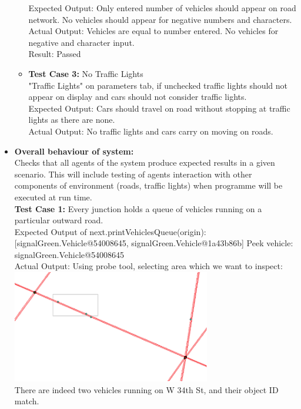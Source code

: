 \documentclass[11pt, oneside]{article}   	%
\begin{document}
\begin{itemize}
\begin{itemize}
Expected Output: Only entered number of vehicles should appear on road network. No vehicles should appear for negative numbers and characters. \hfill \\
Actual Output:  Vehicles are equal to number entered. No vehicles for negative and character input.\hfil \\

Result: Passed
\item \textbf{Test Case 3:} No Traffic Lights\hfill \\
"Traffic Lights" on parameters tab, if unchecked traffic lights should not appear on display and cars should not consider traffic lights.\hfill \\
Expected Output: Cars should travel on road without stopping at traffic lights as there are none.\hfill \\
Actual Output: No traffic lights and cars carry on moving on roads.
\end{itemize}
\item \textbf{Overall behaviour of system: }\hfill \\
Checks that all agents of the system produce expected results in a given scenario. This will include testing of agents interaction with other components of environment (roads, traffic lights) when programme will be executed at run time.\hfill \\
\textbf{Test Case 1:} Every junction holds a queue of vehicles running on a particular outward road.\hfill \\
Expected Output of next.printVehiclesQueue(origin):[signalGreen.Vehicle@54008645, signalGreen.Vehicle@1a43b86b] Peek vehicle: signalGreen.Vehicle@54008645\hfill \\
Actual Output: Using probe tool, selecting area which we want to inspect:\hfill \\
\includegraphics{RoadNetwork}\hfill \\
There are indeed two vehicles running on W 34th St, and their object ID match.

\end{itemize}
\end{document}
